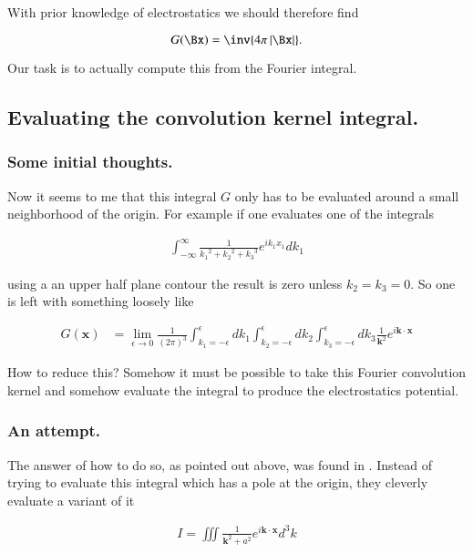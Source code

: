 With prior knowledge of electrostatics we should therefore find

\begin{equation}\label{eqn:poisson:30}
G(\Bx) = \inv{4 \pi \Abs{\Bx}}.
\end{equation}

Our task is to actually compute this from the Fourier integral.

\subsection{Evaluating the convolution kernel integral. }

\subsubsection{Some initial thoughts.}

Now it seems to me that this integral $G$ only has to be evaluated around a small neighborhood of the origin.  For example if one evaluates one of the integrals

\begin{align*}
\int_{-\infty}^\infty \frac{1}{{k_1}^2 + {k_2}^2 + {k_3}^3 } e^{ i k_1 x_1 } dk_1
\end{align*}

using a an upper half plane contour the result is zero unless $k_2 = k_3 = 0$.  So one is left with something loosely like

\begin{align*}
G(\mathbf{x}) &= \lim_{\epsilon \rightarrow 0} \frac{1}{(2 \pi)^3}
\int_{k_1 = -\epsilon}^{\epsilon} dk_1
\int_{k_2 = -\epsilon}^{\epsilon} dk_2
\int_{k_3 = -\epsilon}^{\epsilon} dk_3
 \frac{1}{\mathbf{k}^2} e^{ i \mathbf{k} \cdot \mathbf{x} }
\end{align*}

How to reduce this?  Somehow it must be possible to take this Fourier convolution kernel and somehow evaluate the integral to produce the electrostatics potential.

\subsubsection{An attempt.}

The answer of how to do so, as pointed out above, was found in \citep{byron1992mca}.  Instead of trying to evaluate this integral which has a pole at the origin, they cleverly evaluate a variant of it

\begin{align*}
I = \iiint \frac{1}{\mathbf{k}^2 + a^2} e^{ i \mathbf{k} \cdot \mathbf{x} } d^3 k
\end{align*}

